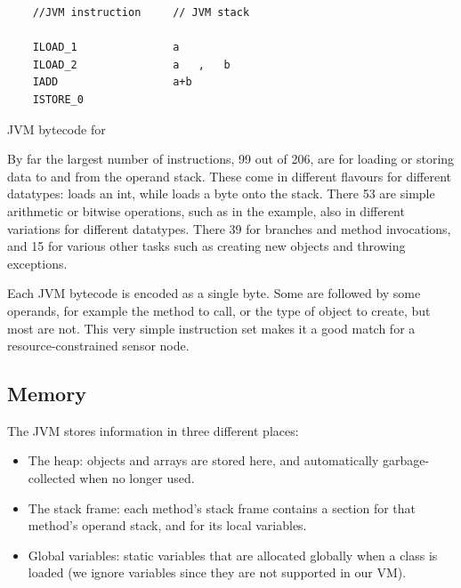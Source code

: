 \begin{listing}
    \centering
    \begin{verbatim}
    //JVM instruction     // JVM stack

    ILOAD_1               a
    ILOAD_2               a   ,   b
    IADD                  a+b
    ISTORE_0
    \end{verbatim}
\caption{JVM bytecode for }
\label{lst-basic-jvm-bytecode-example}
\end{listing}

By far the largest number of instructions, 99 out of 206, are for loading or storing data to and from the operand stack. These come in different flavours for different datatypes:  loads an int, while  loads a byte onto the stack. There 53 are simple arithmetic or bitwise operations, such as  in the example, also in different variations for different datatypes. There 39 for branches and method invocations, and 15 for various other tasks such as creating new objects and throwing exceptions.

Each JVM bytecode is encoded as a single byte. Some are followed by some operands, for example the method to call, or the type of object to create, but most are not. This very simple instruction set makes it a good match for a resource-constrained sensor node.

\subsection{Memory}
\label{sec-background-jvm-memory}
The JVM stores information in three different places:
\begin{itemize}
    \item The heap: objects and arrays are stored here, and automatically garbage-collected when no longer used.
    \item The stack frame: each method's stack frame contains a section for that method's operand stack, and for its local variables.
    \item Global variables: static variables that are allocated globally when a class is loaded (we ignore  variables since they are not supported in our VM).
\end{itemize}

